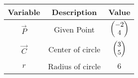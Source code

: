 \begin{tabular}[15pt]{ |c|c|c|}
    \hline
    \textbf{Variable} & \textbf{Description} & \textbf{Value}\\ 
    \hline
	$\vec{P}$ & Given Point & $\begin{pmatrix}-2 \\ 4\end{pmatrix}$\\
    \hline 
	$\vec{C}$ & Center of circle & $\begin{pmatrix}3 \\ 5\end{pmatrix}$\\
    \hline
	$r$ & Radius of circle & $6$\\
    \hline
\end{tabular}